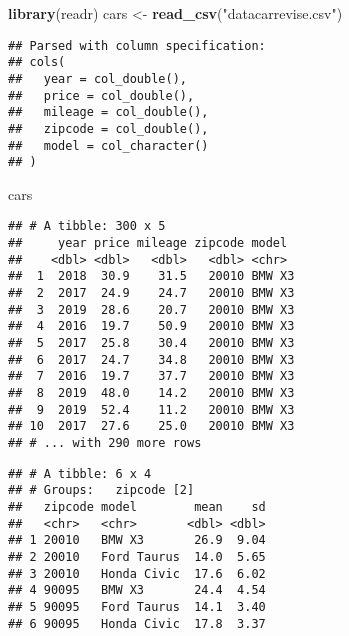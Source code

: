 \documentclass[]{article}
\newenvironment{Shaded}{\begin{snugshade}}{\end{snugshade}}
\newcommand{\DataTypeTok}[1]{\textcolor[rgb]{0.13,0.29,0.53}{#1}}
\newcommand{\KeywordTok}[1]{\textcolor[rgb]{0.13,0.29,0.53}{\textbf{#1}}}
\newcommand{\NormalTok}[1]{#1}
\newcommand{\OperatorTok}[1]{\textcolor[rgb]{0.81,0.36,0.00}{\textbf{#1}}}
\newcommand{\StringTok}[1]{\textcolor[rgb]{0.31,0.60,0.02}{#1}}
\begin{document}
\begin{Shaded}
\begin{Highlighting}[]
\KeywordTok{library}\NormalTok{(readr)}
\NormalTok{cars <-}\StringTok{ }\KeywordTok{read_csv}\NormalTok{(}\StringTok{"datacarrevise.csv"}\NormalTok{)}
\end{Highlighting}
\end{Shaded}

\begin{verbatim}
## Parsed with column specification:
## cols(
##   year = col_double(),
##   price = col_double(),
##   mileage = col_double(),
##   zipcode = col_double(),
##   model = col_character()
## )
\end{verbatim}

\begin{Shaded}
\begin{Highlighting}[]
\NormalTok{cars}
\end{Highlighting}
\end{Shaded}

\begin{verbatim}
## # A tibble: 300 x 5
##     year price mileage zipcode model 
##    <dbl> <dbl>   <dbl>   <dbl> <chr> 
##  1  2018  30.9    31.5   20010 BMW X3
##  2  2017  24.9    24.7   20010 BMW X3
##  3  2019  28.6    20.7   20010 BMW X3
##  4  2016  19.7    50.9   20010 BMW X3
##  5  2017  25.8    30.4   20010 BMW X3
##  6  2017  24.7    34.8   20010 BMW X3
##  7  2016  19.7    37.7   20010 BMW X3
##  8  2019  48.0    14.2   20010 BMW X3
##  9  2019  52.4    11.2   20010 BMW X3
## 10  2017  27.6    25.0   20010 BMW X3
## # ... with 290 more rows
\end{verbatim}

\begin{Shaded}
\end{Shaded}

\begin{verbatim}
## # A tibble: 6 x 4
## # Groups:   zipcode [2]
##   zipcode model        mean    sd
##   <chr>   <chr>       <dbl> <dbl>
## 1 20010   BMW X3       26.9  9.04
## 2 20010   Ford Taurus  14.0  5.65
## 3 20010   Honda Civic  17.6  6.02
## 4 90095   BMW X3       24.4  4.54
## 5 90095   Ford Taurus  14.1  3.40
## 6 90095   Honda Civic  17.8  3.37
\end{verbatim}
\end{document}
